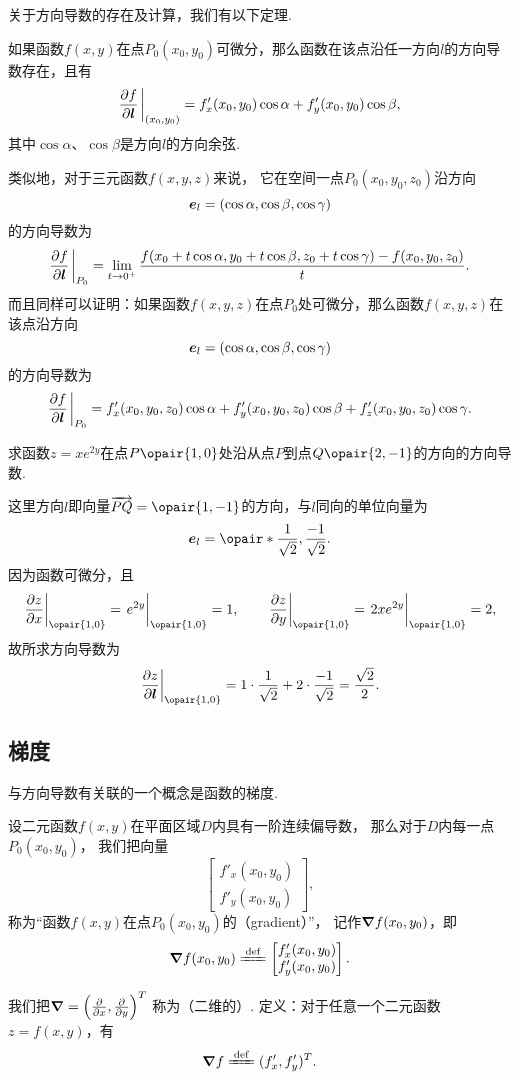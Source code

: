 关于方向导数的存在及计算，我们有以下定理.
\begin{theorem}[充分条件]
如果函数\(f(x,y)\)在点\(P_0(x_0,y_0)\)可微分，那么函数在该点沿任一方向\(l\)的方向导数存在，且有\[
\pdv{f}{\mat{l}}\eval_{(x_0,y_0)}
=f'_x(x_0,y_0) \cos\alpha + f'_y(x_0,y_0) \cos\beta,
\]其中\(\cos\alpha\)、\(\cos\beta\)是方向\(l\)的方向余弦.
\end{theorem}

类似地，对于三元函数\(f(x,y,z)\)来说，
它在空间一点\(P_0(x_0,y_0,z_0)\)沿方向\[
	\boldsymbol{e}_l = (\cos\alpha,\cos\beta,\cos\gamma)
\]的方向导数为\[
	\pdv{f}{\mat{l}}\eval_{P_0}
	= \lim\limits_{t\to0^+}
	\frac{f(x_0+t\cos\alpha,y_0+t\cos\beta,z_0+t\cos\gamma)-f(x_0,y_0,z_0)}{t}.
\]
而且同样可以证明：如果函数\(f(x,y,z)\)在点\(P_0\)处可微分，那么函数\(f(x,y,z)\)在该点沿方向\[
	\boldsymbol{e}_l = (\cos\alpha,\cos\beta,\cos\gamma)
\]的方向导数为\[
\pdv{f}{\mat{l}}\eval_{P_0}
= f'_x(x_0,y_0,z_0) \cos\alpha + f'_y(x_0,y_0,z_0) \cos\beta + f'_z(x_0,y_0,z_0) \cos\gamma.
\]

\begin{example}
求函数\(z = x e^{2y}\)在点\(P\opair{1,0}\)处沿从点\(P\)到点\(Q\opair{2,-1}\)的方向的方向导数.
\begin{solution}
这里方向\(l\)即向量\(\vec{PQ} = \opair{1,-1}\)的方向，与\(l\)同向的单位向量为\[
\mat{e}_l = \opair*{\frac{1}{\sqrt{2}},\frac{-1}{\sqrt{2}}}.
\]因为函数可微分，且\[
\eval{\pdv{z}{x}}_{\opair{1,0}}
= \eval{e^{2y}}_{\opair{1,0}}
= 1,
\qquad
\eval{\pdv{z}{y}}_{\opair{1,0}}
= \eval{2xe^{2y}}_{\opair{1,0}}
= 2,
\]故所求方向导数为\[
\eval{\pdv{z}{\mat{l}}}_{\opair{1,0}}
= 1 \cdot \frac{1}{\sqrt{2}} + 2 \cdot \frac{-1}{\sqrt{2}}
= \frac{\sqrt{2}}{2}.
\]
\end{solution}
\end{example}

\subsection{梯度}
与方向导数有关联的一个概念是函数的梯度.
\begin{definition}
设二元函数\(f(x,y)\)在平面区域\(D\)内具有一阶连续偏导数，
那么对于\(D\)内每一点\(P_0\allowbreak(x_0,y_0)\)，
我们把向量\[
	\begin{bmatrix}
		f'_x(x_0,y_0) \\
		f'_y(x_0,y_0)
	\end{bmatrix},
\]称为“函数\(f(x,y)\)在点\(P_0(x_0,y_0)\)的（gradient）”，
记作\(\grad f(x_0,y_0)\)，即\[
	\grad f(x_0,y_0)
	\defeq
	\begin{bmatrix}
		f'_x(x_0,y_0) \\
		f'_y(x_0,y_0)
	\end{bmatrix}.
\]

我们把\(\grad = \left(\pdv{x},\pdv{y}\right)^T\)
称为（二维的）.
定义：对于任意一个二元函数\(z=f(x,y)\)，有\[
	\grad f
	\defeq
	(f'_x,f'_y)^T.
\]
\end{definition}

